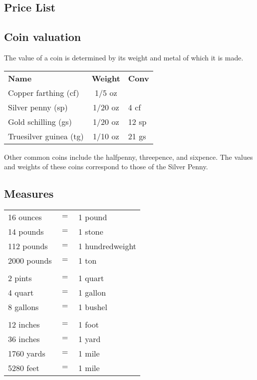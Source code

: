 \begin{multicols}{3}

\section{Price List}
\label{pricelist}

\subsection{Coin valuation}

The value of a coin is determined by its weight and metal of which it
is made.

\begin{tabular}{l@{\hspace{0.5em}}c@{\hspace{1.0em}}l}
\textbf{Name} & \textbf{Weight} & \textbf{Conv} \\
Copper farthing (cf) & 1/5 oz & \\
Silver penny (sp) & 1/20 oz & 4 cf \\
Gold schilling (gs) & 1/20 oz & 12 sp \\
Truesilver guinea (tg) & 1/10 oz & 21 gs \\
\end{tabular}

Other common coins include the halfpenny, threepence, and sixpence.
The values and weights of these coins correspond to those of the
Silver Penny.


\subsection{Measures}

\begin{tabular}{lll}
16 ounces		& $=$ &	1 pound \\
14 pounds		& $=$ & 1 stone \\
112 pounds		& $=$ &	1 hundredweight \\
2000 pounds		& $=$ &	1 ton \\
\\
2 pints			& $=$ &	1 quart \\
4 quart			& $=$ &	1 gallon \\
8 gallons		& $=$ & 1 bushel \\
\\
12 inches		& $=$ & 1 foot \\
36 inches		& $=$ & 1 yard \\
1760 yards		& $=$ & 1 mile \\
5280 feet		& $=$ & 1 mile \\
\end{tabular}


\end{multicols}
